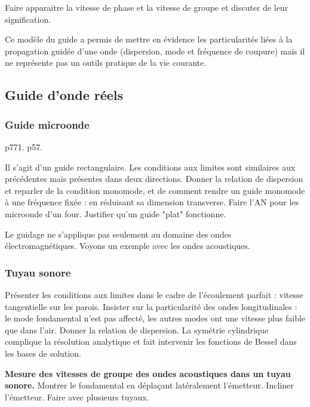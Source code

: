 Faire apparaitre la vitesse de phase et la vitesse de groupe et discuter de leur signification.

\begin{transition}
Ce modèle du guide a permis de mettre en évidence les particularités liées à la propagation guidée d'une onde (dispersion, mode et fréquence de coupure) mais il ne représente pas un outils pratique de la vie courante.
\end{transition}

\subsection{Guide d'onde réels}

\subsubsection{Guide microonde}

\cite{Olivier2000} p771.
\cite{Thibierge2014} p57.

Il s'agit d'un guide rectangulaire.
Les conditions aux limites sont similaires aux précédentes mais présentes dans deux directions.
Donner la relation de dispersion et reparler de la condition monomode, et de comment rendre un guide monomode à une fréquence fixée : en réduisant sa dimension transverse. 
Faire l'AN pour les microonde d'un four.
Justifier qu'un guide "plat" fonctionne.

\begin{transition}
Le guidage ne s'applique pas seulement au domaine des ondes électromagnétiques.
Voyons un exemple avec les ondes acoustiques.
\end{transition}

\subsubsection{Tuyau sonore}

Présenter les conditions aux limites dans le cadre de l'écoulement parfait :  vitesse tangentielle sur les parois.
Insister sur la particularité des ondes longitudinales : le mode fondamental n'est pas affecté, les autres modes ont une vitesse plus faible que dans l'air.
Donner la relation de dispersion.
La symétrie cylindrique complique la résolution analytique et fait intervenir les fonctions de Bessel dans les bases de solution.

\begin{experience}
\textbf{Mesure des vitesses de groupe des ondes acoustiques dans un tuyau sonore.}
Montrer le fondamental en déplaçant latéralement l'émetteur.
Incliner l'émetteur.
Faire avec plusieurs tuyaux.
\end{experience}

